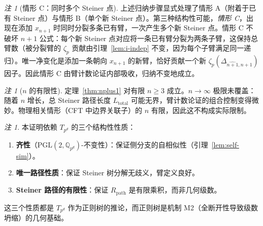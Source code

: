 \documentclass[11pt,a4paper]{ctexart}
\theoremstyle{remark}
\newtheorem{remark}[theorem]{注}
\newcommand{\PGL}{\mathrm{PGL}}
\begin{document}
\begin{remark}[情形 C：同时多个 Steiner 点]
\label{rem:caseC}
上述归纳步骤显式处理了情形 A（附着于已有 Steiner 点）与情形 B（单个新 Steiner 点）。第三种结构性可能，\emph{情形 C}，出现在添加 $x_{n+1}$ 时同时分裂多条已有臂，一次产生多个新 Steiner 点。情形 C 不破坏 $n{+}1$ 公式：每个新 Steiner 点对应将一条已有臂分裂为两条子臂，这保持总臂数（被分裂臂的 $\zeta_p$ 贡献由引理~\ref{lem:i-indep} 不变，因为每个子臂满足同一递归）。唯一净变化是添加一条朝向 $x_{n+1}$ 的新臂，恰好贡献一个新 $\zeta_p(\Delta_{\widehat{n+1}, n+1})$ 因子。因此情形 C 由臂计数论证内部吸收，归纳不变地成立。
\end{remark}

\begin{remark}[$n$ 的有限性]
\label{rem:finite-n}
定理~\ref{thm:nplus1} 对有限 $n \geq 3$ 成立。$n \to \infty$ 极限未覆盖：随着 $n$ 增长，总 Steiner 路径长度 $L_{\text{total}}$ 可能无界，臂计数论证的组合控制变得微妙。物理相关情形（CFT 中边界关联子）的 $n$ 有限，因此这不构成实际限制。
\end{remark}

\begin{remark}
本证明依赖 $T_{p^d}$ 的三个结构性性质：
\begin{enumerate}[leftmargin=2em]
    \item \textbf{齐性}（$\PGL(2, \mathbb{Q}_{p^d})$-不变性）：保证侧分支的自相似性（引理~\ref{lem:self-sim}）。
    \item \textbf{唯一路径性质}：保证 Steiner 树分解无歧义，臂定义良好。
    \item \textbf{Steiner 路径的有限性}：保证 $R_{\mathrm{path}}$ 是有限乘积，而非几何级数。
\end{enumerate}
这三个性质都是 $T_{p^d}$ 作为正则树的推论，而正则树是机制 M2（全断开性导致级数坍缩）的几何基础。
\end{remark}
\end{document}
